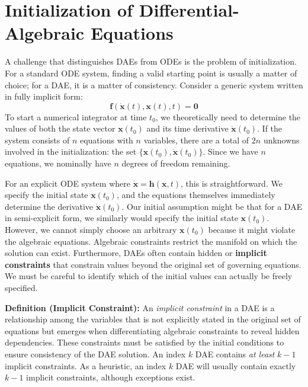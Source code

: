 \section{Initialization of Differential-Algebraic Equations}
\label{sec:dae-initialization}

A challenge that distinguishes DAEs from ODEs is the problem of initialization. For a standard ODE system, finding a valid starting point is usually a matter of choice; for a DAE, it is a matter of consistency. Consider a generic system written in fully implicit form:
\begin{equation}
    \mathbf{f}(\dot{\mathbf{x}}(t), \mathbf{x}(t), t) = \mathbf{0}
\end{equation}
To start a numerical integrator at time $t_0$, we theoretically need to determine the values of both the state vector $\mathbf{x}(t_0)$ and its time derivative $\dot{\mathbf{x}}(t_0)$. If the system consists of $n$ equations with $n$ variables, there are a total of $2n$ unknowns involved in the initialization: the set $\{\mathbf{x}(t_0), \dot{\mathbf{x}}(t_0)\}$. Since we have $n$ equations, we nominally have $n$ degrees of freedom remaining.

For an explicit ODE system where $\dot{\mathbf{x}} = \mathbf{h}(\mathbf{x}, t)$, this is straightforward. We specify the initial state $\mathbf{x}(t_0)$, and the equations themselves immediately determine the derivative $\dot{\mathbf{x}}(t_0)$. Our initial assumption might be that for a DAE in semi-explicit form, we similarly would specify the initial state $\mathbf{x}(t_0)$. However, we cannot simply choose an arbitrary $\mathbf{x}(t_0)$ because it might violate the algebraic equations. Algebraic constraints restrict the manifold on which the solution can exist. Furthermore, DAEs often contain hidden or \textbf{implicit constraints} that constrain values beyond the original set of governing equations. We must be careful to identify which of the initial values can actually be freely specified.


\begin{definitionBox}
\textbf{Definition (Implicit Constraint):} An \emph{implicit constraint} in a DAE is a relationship among the variables that is not explicitly stated in the original set of equations but emerges when differentiating algebraic constraints to reveal hidden dependencies. These constraints must be satisfied by the initial conditions to ensure consistency of the DAE solution. An index $k$ DAE contains \emph{at least} $k-1$ implicit constraints. As a heuristic, an index $k$ DAE will usually contain exactly $k-1$ implicit constraints, although exceptions exist.
\end{definitionBox}

